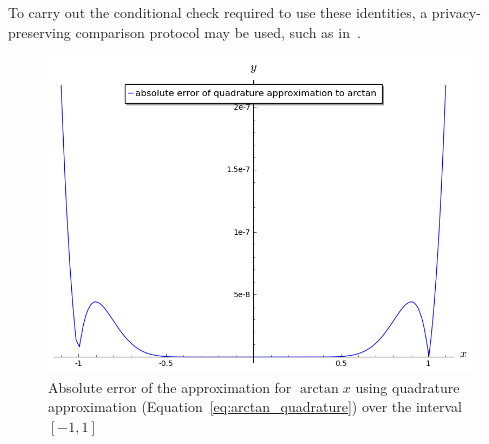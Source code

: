 To carry out the conditional check required to use these identities, a privacy-preserving comparison protocol may be used, such as in~\cite{veugen_improving_2012}.
\begin{figure}[!ht]
		\centering
		\includegraphics[width=.9\linewidth]{figures/arctan_error_2.png}
		\caption{Absolute error of the approximation for $\arctan x$ using quadrature approximation (Equation~\ref{eq:arctan_quadrature}) over the interval $[-1,1]$}
		\label{fig:arctan_error_2}
\end{figure}
